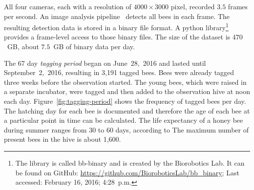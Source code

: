 All four cameras, each with a resolution of $4000\times3000$ pixel, recorded $3.5$ frames per second. 
An image analysis pipeline~\cite{wario2015automatic} detects all bees in each frame.
The resulting detection data is stored in a binary file format.
A python library\footnote{The library is called bb-binary and is created by the Biorobotics Lab. It can be found on GitHub: \url{https://github.com/BioroboticsLab/bb_binary}; Last accessed: February 16, 2016; 4:28~p.m.} provides a frame-level access to those binary files.
The size of the dataset is $470$~GB, about $7.5$~GB of binary data per day.

The 67 day \emph{tagging period} began on June~28,~2016 and lasted until September~2,~2016, resulting in 3,191 tagged bees.
Bees were already tagged three weeks before the observation started.
The young bees, which were raised in a separate incubator, were tagged and then added to the observation hive at noon each day.
Figure~\ref{fig:tagging-period} shows the frequency of tagged bees per day.
The hatching day for each bee is documented and therefore the age of each bee at a particular point in time can be calculated.
The life expectancy of a honey bee during summer ranges from 30 to 60 days, according to \textcite[p.~27]{menzel2016intelligenz}
The maximum number of present bees in the hive is about 1,600.